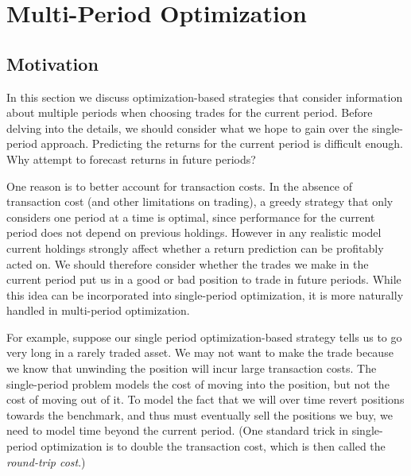 \documentclass[openany]{now}
\begin{document}
\chapter{Multi-Period Optimization}
\label{s-mpo}
\section{Motivation}
In this section we discuss optimization-based strategies that consider
information about multiple periods when choosing trades for the current period.
Before delving into the details, we should consider what we hope to gain
over the single-period approach.
Predicting the returns for the current period is difficult enough.
Why attempt to forecast returns in future periods?

One reason is to better account for transaction costs.
In the absence of transaction cost (and other limitations on trading),
a greedy strategy that only considers one period at a time is optimal,
since performance for the current period does not depend on previous holdings.
However in any realistic model current holdings strongly affect
whether a return prediction can be profitably acted on.
We should therefore consider whether the trades we make in the current period
put us in a good or bad position to trade in future periods.
While this idea can be incorporated into single-period optimization,
it is more naturally handled in multi-period optimization.

For example, suppose our single period optimization-based strategy tells us to
go very long in a rarely traded asset.
We may not want to make the trade because we know that unwinding the position
will incur large transaction costs.
The single-period problem models the cost of moving into the position,
but not the cost of moving out of it.
To model the fact that we will over time revert positions towards the benchmark,
and thus must eventually sell the positions we buy,
we need to model time beyond the current period.
(One standard trick in single-period optimization is to
double the transaction cost, which is then called the
\emph{round-trip cost}.)
\end{document}

